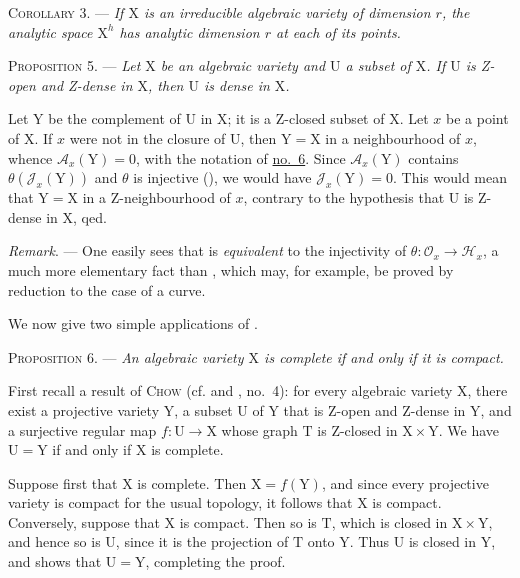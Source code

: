 \textsc{Corollary 3}. --- \emph{If $\mathrm{X}$ is an irreducible algebraic variety of dimension $r$, the analytic space $\mathrm{X}^h$ has analytic dimension $r$ at each of its points.}


\textsc{Proposition 5}. --- \emph{Let $\mathrm{X}$ be an algebraic variety and $\mathrm{U}$ a subset of $\mathrm{X}$. If $\mathrm{U}$ is Z-open and Z-dense in $\mathrm{X}$, then $\mathrm{U}$ is dense in $\mathrm{X}$.}

Let $\mathrm{Y}$ be the complement of $\mathrm{U}$ in $\mathrm{X}$; it is a Z-closed subset of $\mathrm{X}$. Let $x$ be a point of $\mathrm{X}$. If $x$ were not in the closure of $\mathrm{U}$, then $\mathrm{Y}=\mathrm{X}$ in a neighbourhood of $x$, whence $\mathcal{A}_x(\mathrm{Y})=0$, with the notation of \hyperref[gaga:no:6]{no.~6}. Since $\mathcal{A}_x(\mathrm{Y})$ contains $\theta(\mathcal{J}_x(\mathrm{Y}))$ and $\theta$ is injective (), we would have $\mathcal{J}_x(\mathrm{Y})=0$. This would mean that $\mathrm{Y}=\mathrm{X}$ in a Z-neighbourhood of $x$, contrary to the hypothesis that $\mathrm{U}$ is Z-dense in $\mathrm{X}$, qed.

\emph{Remark}. --- One easily sees that  is \emph{equivalent} to the injectivity of $\theta:\mathcal{O}_x\to\mathcal{H}_x$, a much more elementary fact than , which may, for example, be proved by reduction to the case of a curve.

We now give two simple applications of .

\textsc{Proposition 6}. --- \emph{An algebraic variety $\mathrm{X}$ is complete if and only if it is compact.}

First recall a result of \textsc{Chow} (cf.  and , no.~4): for every algebraic variety $\mathrm{X}$, there exist a projective variety $\mathrm{Y}$, a subset $\mathrm{U}$ of $\mathrm{Y}$ that is Z-open and Z-dense in $\mathrm{Y}$, and a surjective regular map $f:\mathrm{U}\to \mathrm{X}$ whose graph $\mathrm{T}$ is Z-closed in $\mathrm{X}\times \mathrm{Y}$. We have $\mathrm{U}=\mathrm{Y}$ if and only if $\mathrm{X}$ is complete.

Suppose first that $\mathrm{X}$ is complete. Then $\mathrm{X}=f(\mathrm{Y})$, and since every projective variety is compact for the usual topology, it follows that $\mathrm{X}$ is compact. Conversely, suppose that $\mathrm{X}$ is compact. Then so is $\mathrm{T}$, which is closed in $\mathrm{X}\times \mathrm{Y}$, and hence so is $\mathrm{U}$, since it is the projection of $\mathrm{T}$ onto $\mathrm{Y}$. Thus $\mathrm{U}$ is closed in $\mathrm{Y}$, and  shows that $\mathrm{U}=\mathrm{Y}$, completing the proof.

